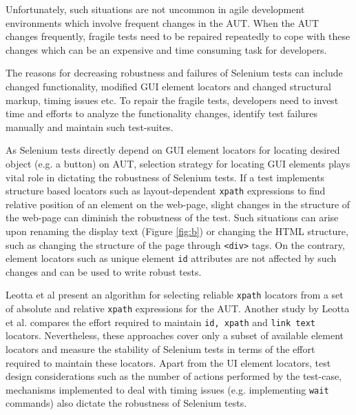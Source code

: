 Unfortunately, such situations are not uncommon in agile development environments which involve frequent changes in the AUT. When the AUT changes frequently, fragile tests need to be repaired repeatedly to cope with these changes which can be an expensive and time consuming task for developers. 

The reasons for decreasing robustness and failures of Selenium tests can include changed functionality, modified GUI element locators and changed structural markup, timing issues etc. To repair the fragile tests, developers need to invest time and efforts to analyze the functionality changes, identify test failures manually and maintain such test-suites. 

As Selenium tests directly depend on GUI element locators for locating desired object (e.g. a button) on AUT, selection strategy for locating GUI elements plays vital role in dictating the robustness of Selenium tests. If a test implements structure based locators such as layout-dependent \texttt{xpath} expressions to find relative position of an element on the web-page, slight changes in the structure of the web-page can diminish the robustness of the test. Such situations can arise upon renaming the display text (Figure \ref{fig:b}) or changing the HTML structure, such as changing the structure of the page through \texttt{<div>} tags. On the contrary, element locators such as unique element \texttt{id} attributes are not affected by such changes and can be used to write robust tests. 

Leotta et al \cite{leotta2015using} present an algorithm for selecting reliable \texttt{xpath} locators from a set of absolute and relative \texttt{xpath} expressions for the AUT. Another study by Leotta et al.\cite{leotta2013comparing} compares the effort required to maintain \texttt{id, xpath} and \texttt{link text} locators. Nevertheless, these approaches cover only a subset of available element locators and measure the stability of Selenium tests in terms of the effort required to maintain these locators. Apart from the UI element locators, test design considerations such as the number of actions performed by the test-case, mechanisms implemented to deal with timing issues (e.g. implementing \texttt{wait} commands) also dictate the robustness of Selenium tests. 


